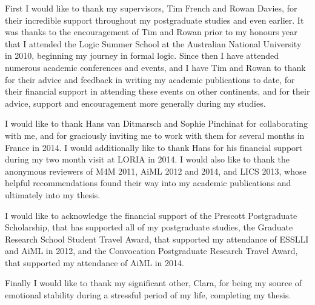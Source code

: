 \begin{acknowledgements}

First I would like to thank my supervisors, Tim French and Rowan Davies, for their incredible support throughout my postgraduate studies and even earlier.
It was thanks to the encouragement of Tim and Rowan prior to my honours year that I attended the Logic Summer School at the Australian National University in 2010, beginning my journey in formal logic.
Since then I have attended numerous academic conferences and events, and I have Tim and Rowan to thank for their advice and feedback in writing my academic publications to date, for their financial support in attending these events on other continents, and for their advice, support and encouragement more generally during my studies.

I would like to thank Hans van Ditmarsch and Sophie Pinchinat for collaborating with me, and for graciously inviting me to work with them for several months in France in 2014.
I would additionally like to thank Hans for his financial support during my two month visit at LORIA in 2014.
I would also like to thank the anonymous reviewers of M4M 2011, AiML 2012 and 2014, and LICS 2013, whose helpful recommendations found their way into my academic publications and ultimately into my thesis.

I would like to acknowledge the financial support of the Prescott Postgraduate Scholarship, that has supported all of my postgraduate studies, the Graduate Research School Student Travel Award, that supported my attendance of ESSLLI and AiML in 2012, and the Convocation Postgraduate Research Travel Award, that supported my attendance of AiML in 2014.

Finally I would like to thank my significant other, Clara, for being my source of emotional stability during a stressful period of my life, completing my thesis.

\end{acknowledgements}
